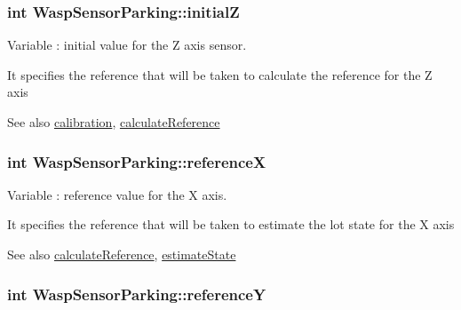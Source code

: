\subsubsection[{\texorpdfstring{initialZ}{initialZ}}]{\setlength{\rightskip}{0pt plus 5cm}int Wasp\+Sensor\+Parking\+::initialZ}\hypertarget{class_wasp_sensor_parking_ac9701254b08807f587833464815f1a5a}{}\label{class_wasp_sensor_parking_ac9701254b08807f587833464815f1a5a}


Variable \+: initial value for the Z axis sensor. 

It specifies the reference that will be taken to calculate the reference for the Z axis \begin{DoxySeeAlso}{See also}
\hyperlink{class_wasp_sensor_parking_a8e99b4ddd7a0f18b2b96a9c4de18f914}{calibration}, \hyperlink{class_wasp_sensor_parking_a8fe1255a714fed88684a89363963eb02}{calculate\+Reference} 
\end{DoxySeeAlso}
\subsubsection[{\texorpdfstring{referenceX}{referenceX}}]{\setlength{\rightskip}{0pt plus 5cm}int Wasp\+Sensor\+Parking\+::referenceX}\hypertarget{class_wasp_sensor_parking_ae02b0503c73ab5f528f06df024db2850}{}\label{class_wasp_sensor_parking_ae02b0503c73ab5f528f06df024db2850}


Variable \+: reference value for the X axis. 

It specifies the reference that will be taken to estimate the lot state for the X axis \begin{DoxySeeAlso}{See also}
\hyperlink{class_wasp_sensor_parking_a8fe1255a714fed88684a89363963eb02}{calculate\+Reference}, \hyperlink{class_wasp_sensor_parking_a5635382fc068370a3b561c94dccbb283}{estimate\+State} 
\end{DoxySeeAlso}
\subsubsection[{\texorpdfstring{referenceY}{referenceY}}]{\setlength{\rightskip}{0pt plus 5cm}int Wasp\+Sensor\+Parking\+::referenceY}\hypertarget{class_wasp_sensor_parking_a808052d32c85055c6cb21e0fffd2a0d4}{}\label{class_wasp_sensor_parking_a808052d32c85055c6cb21e0fffd2a0d4}


